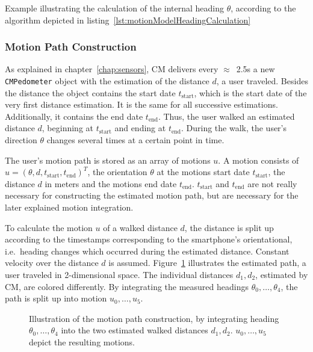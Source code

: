 \begin{table}
	
	\caption{Example illustrating the calculation of the internal heading $\theta$, according to the algorithm depicted in listing~\ref{lst:motionModelHeadingCalculation}}
	\label{tab:motionModelHeadingCalculationExample}
\end{table}

\subsubsection*{Motion Path Construction}
As explained in chapter~\ref{chap:sensors}, \acs{CM} delivers every $\approx$~2.5s a new \texttt{CMPedometer} object with the estimation of the distance $d$, a user traveled. Besides the distance the object contains the start date $t_\text{start}$, which is the start date of the very first distance estimation. It is the same for all successive estimations. Additionally, it contains the end date $t_\text{end}$. Thus, the user walked an estimated distance $d$, beginning at $t_\text{start}$ and ending at $t_\text{end}$. During the walk, the user's direction $\theta$ changes several times at a certain point in time.

The user's motion path is stored as an array of motions $u$. A motion consists of $u = (\theta, d, t_\text{start}, t_\text{end})^T$, the orientation $\theta$ at the motions start date $t_\text{start}$, the distance $d$ in meters and the motions end date $t_\text{end}$. $t_\text{start}$ and $t_\text{end}$ are not really necessary for constructing the estimated motion path, but are necessary for the later explained motion integration.

To calculate the motion $u$ of a walked distance $d$, the distance is split up according to the timestamps corresponding to the smartphone's orientational, i.e.\ heading changes which occurred during the estimated distance. Constant velocity over the distance $d$ is assumed. Figure~\ref{fig:mm_path} illustrates the estimated path, a user traveled in 2-dimensional space. The individual distances $d_1, d_2$, estimated by \acs{CM}, are colored differently. By integrating the measured headings $\theta_0, \ldots, \theta_4$, the path is split up into motion $u_0, \ldots, u_5$.


\begin{figure}
	
	\caption{Illustration of the motion path construction, by integrating heading $\theta_0, \ldots, \theta_4$ into the two estimated walked distances $d_1, d_2$. $u_0, \ldots, u_5$ depict the resulting motions.}
	\label{fig:mm_path}
\end{figure}


